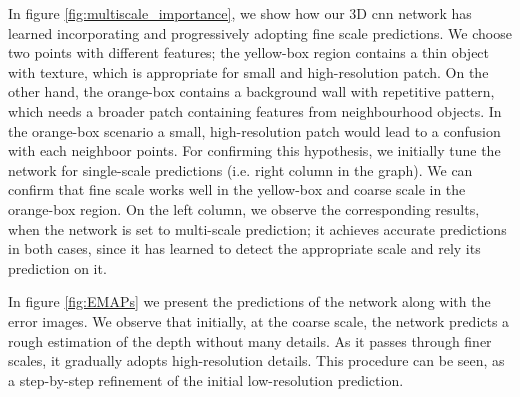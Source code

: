 \documentclass[10pt]{article}
\begin{document}
In figure \ref{fig:multiscale_importance}, we show how our 3D cnn network has learned incorporating and progressively adopting fine scale predictions. We choose two points with different features; the yellow-box region contains a thin object with texture, which is appropriate for small and high-resolution patch. On the other hand, the orange-box contains a background wall with repetitive pattern, which needs a broader patch containing features from neighbourhood objects. In the orange-box scenario a small, high-resolution patch would lead to a confusion with each neighboor points. For confirming this hypothesis, we initially tune the network for single-scale predictions (i.e. right column in the graph). We can confirm that fine scale works well in the yellow-box and coarse scale in the orange-box region. On the left column, we observe the corresponding results, when the network is set to multi-scale prediction; it achieves accurate predictions in both cases, since it has learned to detect the appropriate scale and rely its prediction on it.

In figure \ref{fig:EMAPs} we present the predictions of the network along with the error images. We observe that initially, at the coarse scale, the network predicts a rough estimation of the depth without many details. As it passes through finer scales, it gradually adopts high-resolution details. This procedure can be seen, as a step-by-step refinement of the initial low-resolution prediction.
\end{document}
